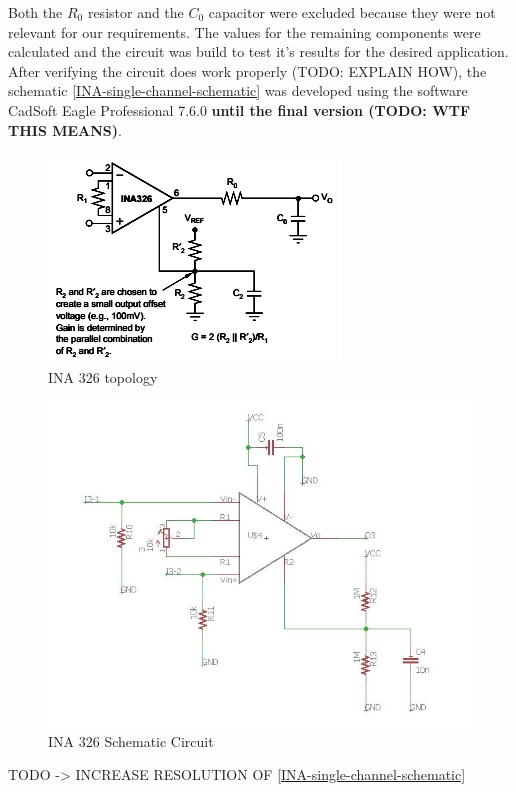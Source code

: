 Both the $R_0$ resistor and the $C_0$ capacitor were excluded because they were not
relevant for our requirements. The values for the remaining components were calculated
and the circuit was build to test it's results for the desired application.
After verifying the circuit does work properly (TODO: EXPLAIN HOW), the schematic \autoref{INA-single-channel-schematic} was
developed using the software CadSoft Eagle Professional 7.6.0 \textbf{until the final version (TODO: WTF THIS MEANS)}.
\begin{figure}[!htpb]
  \centering
  \caption{INA 326 topology}
  \label{INA_topology}
  \includegraphics[scale=0.7]{images/INA/datasheet}
\end{figure}

\begin{figure}[!htpb]
  \centering
  \caption{INA 326 Schematic Circuit}
  \label{INA-single-channel-schematic}
  \includegraphics[scale=0.65]{images/INA/single-channel-schematic}
\end{figure}
TODO -> INCREASE RESOLUTION OF \autoref{INA-single-channel-schematic}\\


